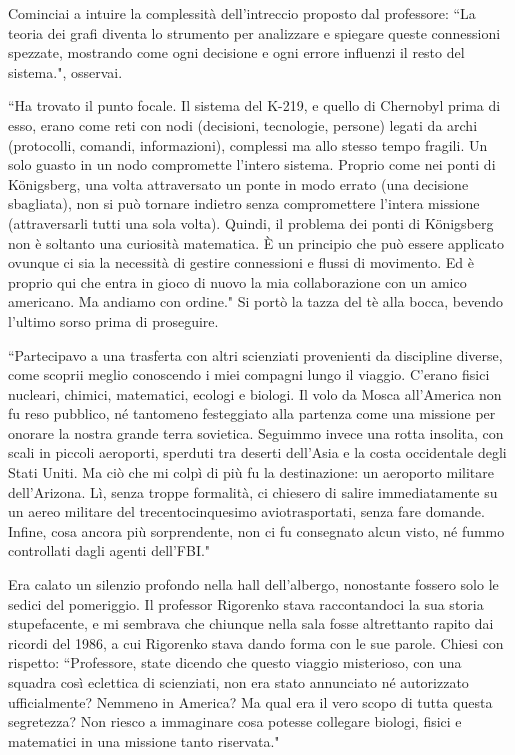 \documentclass[12pt,b5paper]{article}
\begin{document}
Cominciai a intuire la complessità dell'intreccio proposto dal professore: 
``La teoria dei grafi diventa lo strumento per analizzare e spiegare queste
connessioni spezzate, mostrando come ogni decisione e ogni errore influenzi
il resto del sistema.", osservai.

``Ha trovato il punto focale. Il sistema del K-219, e quello di Chernobyl prima
di esso, erano come reti con nodi (decisioni, tecnologie, persone) legati da
archi (protocolli, comandi, informazioni), complessi ma allo stesso tempo fragili.
Un solo guasto in un nodo compromette l'intero sistema. Proprio come nei ponti
di Königsberg, una volta attraversato un ponte in modo errato
(una decisione sbagliata), non si può tornare indietro senza compromettere
l'intera missione (attraversarli tutti una sola volta). Quindi, il problema dei
ponti di Königsberg non è soltanto una curiosità matematica. È un principio che
può essere applicato ovunque ci sia la necessità di gestire connessioni e flussi
di movimento. Ed è proprio qui che entra in gioco di nuovo la mia collaborazione
con un amico americano. Ma andiamo con ordine." Si portò la tazza del tè alla
bocca, bevendo l'ultimo sorso prima di proseguire.

``Partecipavo a una trasferta con altri scienziati provenienti da discipline
diverse, come scoprii meglio conoscendo i miei compagni lungo il viaggio.
C'erano fisici nucleari, chimici, matematici, ecologi e biologi. Il volo da
Mosca all'America non fu reso pubblico, né tantomeno festeggiato alla partenza
come una missione per onorare la nostra grande terra sovietica. Seguimmo invece
una rotta insolita, con scali in piccoli aeroporti, sperduti tra deserti
dell'Asia e la costa occidentale degli Stati Uniti. Ma ciò che mi colpì di più
fu la destinazione: un aeroporto militare dell'Arizona. Lì, senza troppe
formalità, ci chiesero di salire immediatamente su un aereo militare del
trecentocinquesimo aviotrasportati, senza fare domande. Infine, cosa ancora
più sorprendente, non ci fu consegnato alcun visto, né fummo controllati dagli
agenti dell'FBI."

Era calato un silenzio profondo nella hall dell'albergo, nonostante fossero solo
le sedici del pomeriggio. Il professor Rigorenko stava raccontandoci la sua storia
stupefacente, e mi sembrava che chiunque nella sala fosse altrettanto rapito dai
ricordi del 1986, a cui Rigorenko stava dando forma con le sue parole. Chiesi con
rispetto: ``Professore, state dicendo che questo viaggio misterioso, con una squadra
così eclettica di scienziati, non era stato annunciato né autorizzato ufficialmente?
Nemmeno in America? Ma qual era il vero scopo di tutta questa segretezza? Non riesco
a immaginare cosa potesse collegare biologi, fisici e matematici in una missione
tanto riservata."
\end{document}
